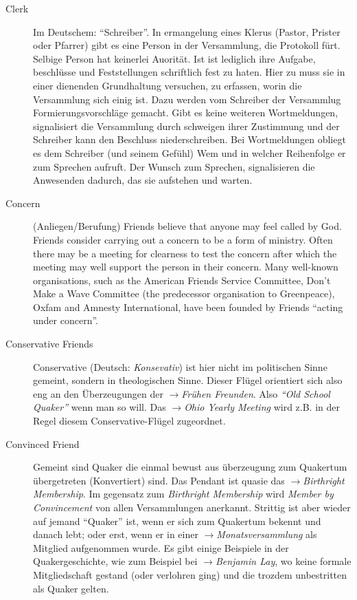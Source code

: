 \begin{description}
 \item[Clerk] Im Deutschem: "`Schreiber"'. In ermangelung eines Klerus (Pastor, Prister oder Pfarrer) gibt es eine Person in der Versammlung, die Protokoll fürt. Selbige Person hat keinerlei Auorität. Ist ist lediglich ihre Aufgabe, beschlüsse und Feststellungen schriftlich fest zu haten. Hier zu muss sie in einer dienenden Grundhaltung versuchen, zu erfassen, worin die Versammlung sich einig ist. Dazu werden vom Schreiber der Versammlug Formierungsvorschläge gemacht. Gibt es keine weiteren Wortmeldungen, signalisiert die Versammlung durch schweigen ihrer Zustimmung und der Schreiber kann den Beschluss niederschreiben. Bei Wortmeldungen obliegt es dem Schreiber (und seinem Gefühl) Wem und in welcher Reihenfolge er zum Sprechen aufruft. Der Wunsch zum Sprechen, signalisieren die Anwesenden dadurch, das sie aufstehen und warten.

\item[Concern] (Anliegen/Berufung)
    Friends believe that anyone may feel called by God. Friends consider carrying out a concern to be a form of ministry. Often there may be a meeting for clearness to test the concern after which the meeting may well support the person in their concern. Many well-known organisations, such as the American Friends Service Committee, Don't Make a Wave Committee (the predecessor organisation to Greenpeace), Oxfam and Amnesty International, have been founded by Friends "`acting under concern"'.


 \item[Conservative Friends] Conservative (Deutsch: \textit{Konsevativ}) ist hier nicht im politischen Sinne gemeint, sondern in theologischen Sinne. Dieser Flügel orientiert sich also eng an den Überzeugungen der $\to$\textit{Frühen Freunden}. Also \textit{"`Old School Quaker"'} wenn man so will. Das $\to$\textit{Ohio Yearly Meeting} wird z.B. in der Regel diesem Conservative-Flügel zugeordnet.

 \item[Convinced Friend] Gemeint sind Quaker die einmal bewust aus überzeugung zum Quakertum übergetreten (Konvertiert) sind. Das Pendant ist quasie das $\to$\textit{Birthright Membership}. Im gegensatz zum \textit{Birthright Membership} wird \textit{Member by Convincement} von allen Versammlungen anerkannt. Strittig ist aber wieder auf jemand "`Quaker"' ist, wenn er sich zum Quakertum bekennt und danach lebt; oder erst, wenn er in einer $\to$\textit{Monatsversammlung} als Mitglied aufgenommen wurde. Es gibt einige Beispiele in der Quakergeschichte, wie zum Beispiel bei $\to$\textit{Benjamin Lay}, wo keine formale Mitgliedschaft gestand (oder verlohren ging) und die trozdem unbestritten als Quaker gelten.


\end{description}
